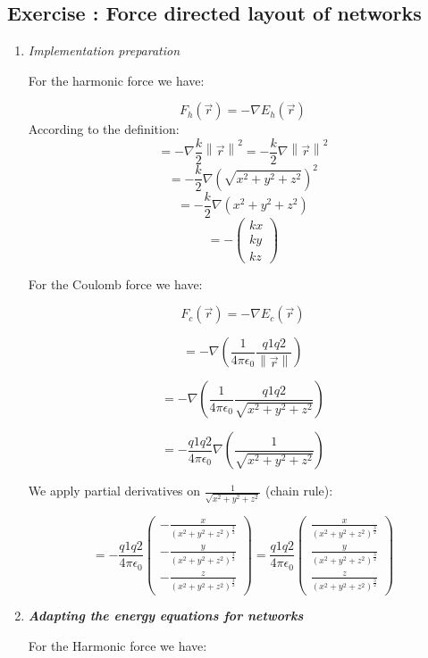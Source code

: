 \documentclass[10pt,a4paper]{article}
\newcommand{\norm}[1]{\left\lVert#1\right\rVert}
\newcommand{\exercise}[1]
{
  \stepcounter{subsection}
  \subsection*{Exercise \thesubsection: #1}

}
\begin{document}
\newpage
\exercise{Force directed layout of networks}
\begin{enumerate}
	
	\item \textit{Implementation preparation}
	
	For the harmonic force we have: 
	
	
\[ F_{h}(\vec{r}) = -\nabla E_{h}(\vec{r})\]
According to the definition: 
\[ = -\nabla \frac{k}{2} \norm{\vec{r}}^2 = -\frac{k}{2} \nabla \norm{\vec{r}}^2 \]
\[ = -\frac{k}{2}\nabla  (\sqrt{x^2 + y^2 + z^2})^2  \]
\[ = -\frac{k}{2}\nabla  (x^2 + y^2 + z^2)  \]
\[ = -\begin{pmatrix}
kx\\
ky\\
kz
	\end{pmatrix} \]


	For the Coulomb force we have: 
	
	\[ F_{c}(\vec{r}) = -\nabla E_{c}(\vec{r})\]

	\[ = -\nabla(\frac{1}{4\pi\epsilon_{0}} \frac{q1 q2}{\norm{\vec{r}}}) \]
	
	\[ = -\nabla(\frac{1}{4\pi\epsilon_{0}} \frac{q1 q2}{\sqrt{x^2 + y^2 + z^2}}) \]
	
	\[ = - \frac{q1 q2}{4\pi\epsilon_{0}} \nabla ( \frac{1}{\sqrt{x^2 + y^2 + z^2}}) \]
	
	We apply partial derivatives on $ \frac{1}{\sqrt{x^2 + y^2 + z^2}}$ (chain rule): 
	
	\[ = - \frac{q1 q2}{4\pi\epsilon_{0}} \begin{pmatrix}
	-\frac{x}{(x^2 + y^2 + z^2)^{\frac{3}{2}}}\\
	-\frac{y}{(x^2 + y^2 + z^2)^{\frac{3}{2}}}\\
	-\frac{z}{(x^2 + y^2 + z^2)^{\frac{3}{2}}}
	\end{pmatrix} = \frac{q1 q2}{4\pi\epsilon_{0}} \begin{pmatrix}
	\frac{x}{(x^2 + y^2 + z^2)^{\frac{3}{2}}}\\
	\frac{y}{(x^2 + y^2 + z^2)^{\frac{3}{2}}}\\
	\frac{z}{(x^2 + y^2 + z^2)^{\frac{3}{2}}}
	\end{pmatrix} \]
	
	
	
	\item \textit{\textbf{Adapting the energy equations for networks}}
	
	For the Harmonic force we have: 
	
	

\end{enumerate}
\end{document}
